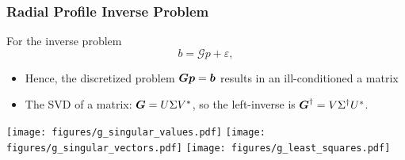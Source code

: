 \documentclass[]{beamer}
\newcommand{\bm}[1]{\mbox{\boldmath$#1$}}
\newcommand{\vect}[1]{\bm{#1}}
\newcommand{\eps}{\varepsilon}
\begin{document}
%
\begin{frame}
  \frametitle{Radial Profile Inverse Problem}
  For the inverse problem
  \begin{equation*}
    b = \mathcal G p + \eps,
  \end{equation*}
  \begin{itemize}
    \item Hence, the discretized problem $\vect G \vect p = \vect b$ results in an ill-conditioned a matrix 
    \item The \alert{SVD} of a matrix: $\vect G = U \Sigma V^*$, so the left-inverse is $\vect G^\dagger = V \Sigma^\dagger U^*$.
  \end{itemize}
  \hspace{-2.5em}
  \texttt{[image: figures/g\_singular\_values.pdf]}
  \texttt{[image: figures/g\_singular\_vectors.pdf]}
  \texttt{[image: figures/g\_least\_squares.pdf]}
\end{frame}
\end{document}
